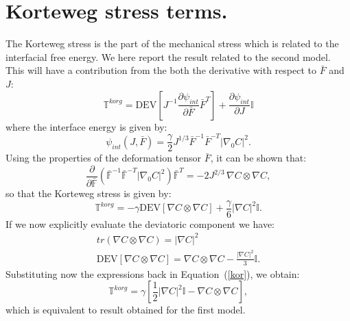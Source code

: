 \documentclass[12pt]{extarticle}
\newcommand{\F}{\ensuremath{\mathbb{F}}}
\begin{document}
\section{Korteweg stress terms.}
The Korteweg stress is the part of the mechanical stress which is related to the interfacial free energy. We here report the result related to the second model. This will have a contribution from the both the derivative with respect to $\bar{F}$ and $J$:
\begin{equation}
	\mathbb{T}^{korg} = \text{DEV}\left[J^{-1}\frac{\partial \psi_{int}}{\partial \bar{F}}\bar{F}^T\right] + \frac{\partial \psi_{int}}{\partial J} \mathbb{I}
\end{equation}
where the interface energy is given by:
\begin{equation}
\psi_{int}(J,\bar{F}) = \frac{\gamma}{2} J^{1/3} \bar{F}^{-1}\bar{F}^{-T} \left|\nabla_0 C\right|^2.
\end{equation}
Using the properties of the deformation tensor $\bar{F}$, it can be shown that:
\begin{equation}
\frac{\partial }{\partial \bar{\F}} \left(\bar{\F}^{-1} \bar{\F}^{-T} \left|\nabla_0 C\right|^2\right) \bar{\F}^T = -2 J^{2/3} \,\nabla C \otimes \nabla C,
\end{equation} 
so that the Korteweg stress is given by:
\begin{equation}
		\mathbb{T}^{korg} = - \gamma \text{DEV} \left[ \nabla C \otimes \nabla C\right] + \frac{\gamma}{6} \left|\nabla C\right|^2 \mathbb{I}.
		\label{kor}
\end{equation}
If we now explicitly evaluate the deviatoric component we have:
\begin{equation*}
\begin{aligned}
tr(\nabla C \otimes \nabla C) = \left|\nabla C\right|^2 \\ \text{DEV}\left[\nabla C \otimes \nabla C\right] = \nabla C \otimes \nabla C -\frac{\left|\nabla C\right|^2}{3} \mathbb{I}.
\end{aligned}
\end{equation*}
Substituting now the expressions back in Equation~(\ref{kor}), we obtain:
\begin{equation}
\mathbb{T}^{korg} = \gamma \left[\frac{1}{2} \left|\nabla C\right|^2 \mathbb{I} - \nabla C \otimes \nabla C\right],
\end{equation}
which is equivalent to result obtained for the first model.


\end{document}
